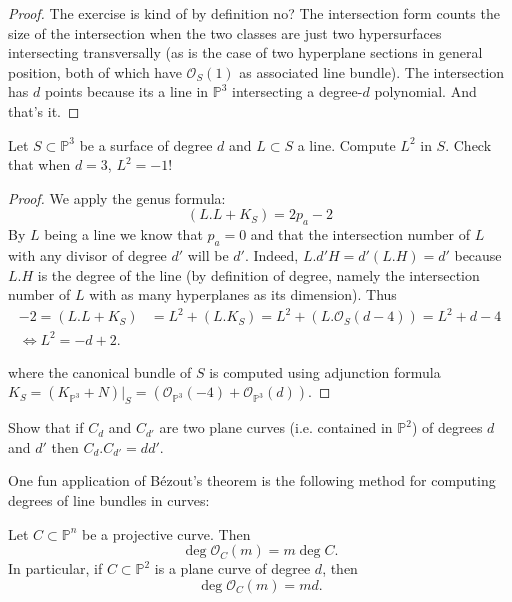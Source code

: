 \begin{proof}
The exercise is kind of by definition no?
The intersection form counts the size of the
intersection when
the two classes are just two hypersurfaces
intersecting transversally (as is the case of
two
hyperplane sections in general position,
both of which have $\mathcal{O}_S(1)$ as
associated line bundle). The intersection
has $d$ points because its a line in
$\mathbb{P}^3$
intersecting a degree-$d$ polynomial.
And that's it.
\end{proof}

\begin{exercise}
\label{exercise-intersection-lines}
Let $S \subset \mathbb{P}^3$ be a surface
of degree $d$ and $L \subset S$ a line.
Compute $L^2$ in $S$. Check that when $d=3$,
$L^2=-1$!
\end{exercise}

\begin{proof}
We apply the genus formula:
$$
(L.L+K_S)=2p_a-2
$$
By $L$ being a line we know that $p_a=0$
and that the intersection number of $L$
with any divisor of degree $d'$ will be $d'$.
Indeed, $L.d'H=d'(L.H)=d'$
because $L.H$ is the degree of the line
(by definition of degree, namely
the intersection number of $L$ with as many
hyperplanes as its dimension).
Thus
$$
\begin{aligned}
-2=(L.L+K_S)&=L^2+(L.K_S)=L^2+(L.\mathcal{O}
_S(d-4))
=L^2+d-4\\
\iff L^2=-d+2.
\end{aligned}
$$

\noindent
where the canonical bundle of $S$
is computed using adjunction formula
$K_S=(K_{\mathbb{P}^3}+N)|_S
=(\mathcal{O}_{\mathbb{P}^3}(-4)+\mathcal{O}
_{\mathbb{P}^3}(d))$.
\end{proof}

\begin{exercise}[Bézout]
\label{exercise-bezout}
Show that if $C_d$ and $C_{d'}$ are two plane
curves
(i.e. contained in $\mathbb{P}^2$)
of degrees $d$ and $d'$ then
$C_d.C_{d'}=dd'$.
\end{exercise}

\noindent
One fun application of Bézout's theorem
is the following method for computing
degrees of line bundles in curves:

\begin{lemma}
\label{lemma-line-bundle-degree}
Let $C\subset \mathbb P^n$ be a
projective curve. Then
$$
  \deg \mathcal O_C(m)=m\deg C.
$$
In particular, if $C\subset \mathbb P^2$
is a plane curve of degree $d$, then
$$
  \deg \mathcal O_C(m)=md.
$$
\end{lemma}

